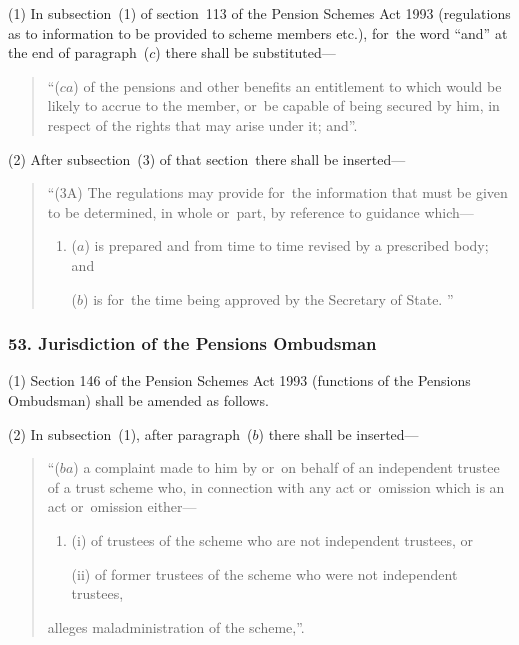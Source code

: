 \documentclass[12pt,a4paper]{article}
\begin{document}
(1) In subsection~(1)  of section~113 of the Pension Schemes Act 1993 (regulations as to information to be provided to scheme members etc.), for~the word “and” at the end of paragraph~($c$)  there shall be substituted—
\begin{quotation}
“($ca$) of the pensions and other benefits an entitlement to which would be likely to accrue to the member, or~be capable of being secured by him, in respect of the rights that may arise under it; and”.
\end{quotation}

(2) After subsection~(3)  of that section~there shall be inserted—
\begin{quotation}
“(3A) The regulations may provide for~the information that must be given to be determined, in whole or~part, by reference to guidance which—
\begin{enumerate}\item[]
($a$) is prepared and from time to time revised by a prescribed body; and

($b$) is for~the time being approved by the Secretary of State.%
”
\end{enumerate}
%
%
\end{quotation}


\subsubsection{53. Jurisdiction of the Pensions Ombudsman}

(1) Section 146 of the Pension Schemes Act 1993 (functions of the Pensions Ombudsman) shall be amended as follows.

(2) In subsection~(1), after paragraph~($b$)  there shall be inserted—
\begin{quotation}
“($ba$) a complaint made to him by or~on behalf of an independent trustee of a trust scheme who, in connection with any act or~omission which is an act or~omission either—
\begin{enumerate}\item[]
(i) of trustees of the scheme who are not independent trustees, or

(ii) of former trustees of the scheme who were not independent trustees,
\end{enumerate}
alleges maladministration of the scheme,”.
\end{quotation}
\end{document}
